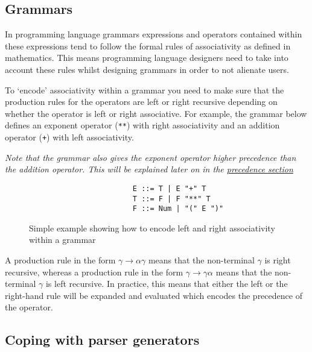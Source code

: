 \subsection{Grammars}

In programming language grammars expressions and operators contained within these expressions tend to follow the formal rules of associativity as defined in mathematics. This means programming language designers need to take into account these rules whilst designing grammars in order to not alienate users.

To `encode' associativity within a grammar you need to make sure that the production rules for the operators are left or right recursive depending on whether the operator is left or right associative. For example, the grammar below defines an exponent operator (\verb|**|) with right associativity and an addition operator (\verb|+|) with left associativity.

\textit{Note that the grammar also gives the exponent operator higher precedence than the addition operator. This will be explained later on in the \hyperref[sec:precedence]{precedence section}}

\begin{figure}[H]
    \begin{center}
        \begin{verbatim}
                        E ::= T | E "+" T
                        T ::= F | F "**" T
                        F ::= Num | "(" E ")"
        \end{verbatim}
    \end{center}
    \vspace{-1.5em}
    \caption{\label{fig:4.2}Simple example showing how to encode left and right associativity within a grammar}
\end{figure}

A production rule in the form $\gamma \rightarrow \alpha \gamma$ means that the non-terminal $\gamma$ is right recursive, whereas a production rule in the form $\gamma \rightarrow \gamma \alpha$ means that the non-terminal $\gamma$ is left recursive. In practice, this means that either the left or the right-hand rule will be expanded and evaluated which encodes the precedence of the operator.\textsuperscript{\cite{abrahamson_2021}\cite{lam_2019}}

\subsection{Coping with parser generators}

